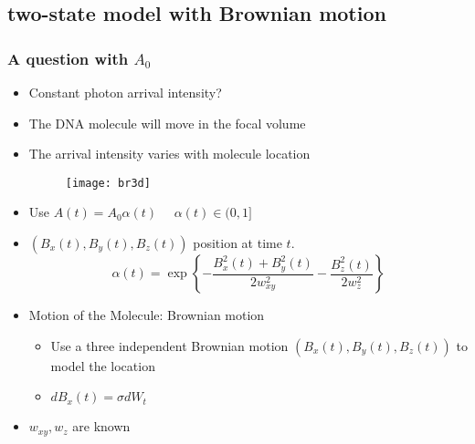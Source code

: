 \documentclass[11pt]{beamer}
\newcommand{\bit}{\begin{itemize}\setlength{\itemsep}{0cm}\setlength{\topsep}{0cm}}
\newcommand{\eit}{\end{itemize}}
\begin{document}
\subsection{two-state model with Brownian motion}
\begin{frame}
\frametitle{A question with $A_0$}
\bit
\item Constant photon arrival intensity? 
\item The DNA molecule will move in the focal volume
\item The arrival intensity varies with molecule location
\begin{figure}
\centering
\texttt{[image: br3d]}
\end{figure}  
 \item Use $A(t)=A_0\alpha(t)$ $\quad \alpha(t)\in (0,1]$


\eit
\end{frame}
\begin{frame}
 
\bit
\item $(B_x(t),B_y(t),B_z(t))$ position at time $t$.  $$\alpha(t)=\exp\left\{-\dfrac{B^2_x(t)+B^2_y(t)}{2w^2_{xy}}-\dfrac{B^2_z(t)}{2w_z^2}\right\}$$
\item Motion of the Molecule: {\color{red} Brownian motion}
\bit
\item Use a three independent Brownian motion $(B_x(t),B_y(t),B_z(t))$ to model the location
\item $dB_x(t)=\sigma dW_t$
\eit
\item $w_{xy},w_z$ are known
\eit
\end{frame}
\end{document}
